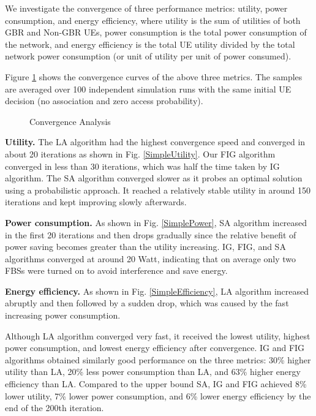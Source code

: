 \documentclass[conference]{IEEEtran}
\newcommand{\myitem}{{\setlength{\parindent}{8pt}\footnotesize{$\bullet~$ }}}
\begin{document}
We investigate the convergence of three performance metrics: utility, power consumption, and energy efficiency, where utility is the sum of utilities of both GBR and Non-GBR UEs, power consumption is the total power consumption of the network, and energy efficiency is the total UE utility divided by the total network power consumption (or unit of utility per unit of power consumed).  


Figure \ref{Convergence} shows the convergence curves of the above three metrics. The samples are averaged over 100 independent simulation runs with the same initial UE decision (no association and zero access probability). 

\begin{figure}[!htbp]
\centering
{}

\caption{Convergence Analysis}
\label{Convergence}
\end{figure}

\noindent \myitem \textbf{Utility.} The LA algorithm had the highest convergence speed and converged in about 20 iterations as shown in Fig. \ref{SimpleUtility}. Our FIG algorithm converged in less than 30 iterations, which was half the time taken by IG algorithm. The SA algorithm converged slower as it probes an optimal solution using a probabilistic approach. It reached a relatively stable utility in around 150 iterations and kept improving slowly afterwards. 

\noindent \myitem \textbf{Power consumption.} As shown in Fig. \ref{SimplePower}, SA algorithm increased in the first 20 iterations and then drops gradually since the relative benefit of power saving becomes greater than the utility increasing. IG, FIG, and SA algorithms converged at around 20 Watt, indicating that on average only two FBSs were turned on to avoid interference and save energy.

\noindent \myitem \textbf{Energy efficiency.} As shown in Fig. \ref{SimpleEfficiency}, LA algorithm increased abruptly and then followed by a sudden drop, which was caused by the fast increasing power consumption.

Although LA algorithm converged very fast, it received the lowest utility, highest power consumption, and lowest energy efficiency after convergence. IG and FIG algorithms obtained similarly good performance on the three metrics: 30\% higher utility than LA, 20\% less power consumption than LA, and 63\% higher energy efficiency than LA. Compared to the upper bound SA, IG and FIG achieved 8\% lower utility, 7\% lower power consumption, and 6\% lower energy efficiency by the end of the 200th iteration.
\end{document}
